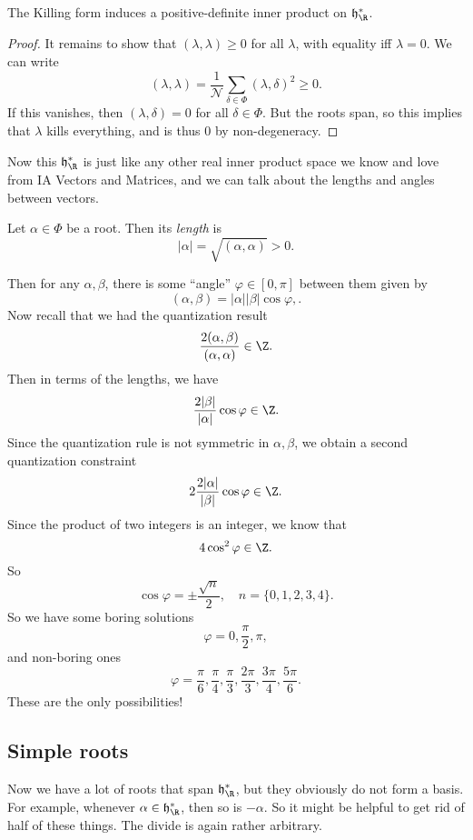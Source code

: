 \documentclass[a4paper]{article}
\begin{document}
\begin{prop}
  The Killing form induces a positive-definite inner product on $\mathfrak{h}_\R^*$.
\end{prop}

\begin{proof}
  It remains to show that $(\lambda, \lambda) \geq 0$ for all $\lambda$, with equality iff $\lambda = 0$. We can write
  \[
    (\lambda, \lambda) = \frac{1}{\mathcal{N}} \sum_{\delta \in \Phi}(\lambda, \delta)^2 \geq 0.
  \]
  If this vanishes, then $(\lambda, \delta) = 0$ for all $\delta \in \Phi$. But the roots span, so this implies that $\lambda$ kills everything, and is thus $0$ by non-degeneracy.
\end{proof}

Now this $\mathfrak{h}_\R^*$ is just like any other real inner product space we know and love from IA Vectors and Matrices, and we can talk about the lengths and angles between vectors.

\begin{defi}
  Let $\alpha \in \Phi$ be a root. Then its \emph{length} is
  \[
    |\alpha| = \sqrt{(\alpha, \alpha)} > 0.
  \]
\end{defi}

Then for any $\alpha, \beta$, there is some ``angle'' $\varphi \in [0, \pi]$ between them given by
\[
  (\alpha, \beta) = |\alpha||\beta| \cos \varphi,.
\]
Now recall that we had the quantization result
\[
  \frac{2(\alpha, \beta)}{(\alpha, \alpha)} \in \Z.
\]
Then in terms of the lengths, we have
\[
  \frac{2 |\beta|}{|\alpha|} \cos \varphi \in \Z.
\]
Since the quantization rule is not symmetric in $\alpha, \beta$, we obtain a second quantization constraint
\[
  2\frac{2|\alpha|}{|\beta|} \cos \varphi \in \Z.
\]
Since the product of two integers is an integer, we know that
\[
  4 \cos^2 \varphi \in \Z.
\]
So
\[
  \cos \varphi = \pm \frac{\sqrt{n}}{2}, \quad n = \{0, 1, 2, 3, 4\}.
\]
So we have some boring solutions
\[
  \varphi = 0, \frac{\pi}{2}, \pi,
\]
and non-boring ones
\[
  \varphi = \frac{\pi}{6}, \frac{\pi}{4}, \frac{\pi}{3}, \frac{2\pi}{3}, \frac{3 \pi}{4}, \frac{5 \pi}{6}.
\]
These are the only possibilities!

\subsection{Simple roots}
Now we have a lot of roots that span $\mathfrak{h}^*_\R$, but they obviously do not form a basis. For example, whenever $\alpha \in \mathfrak{h}^*_\R$, then so is $-\alpha$. So it might be helpful to get rid of half of these things. The divide is again rather arbitrary.
\end{document}
